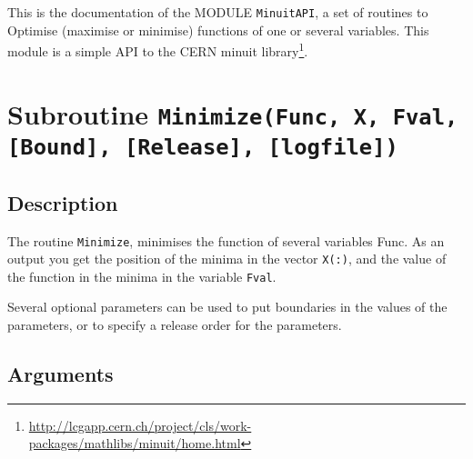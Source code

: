 
This is the documentation of the MODULE \texttt{MinuitAPI}, a set
of routines to Optimise (maximise or minimise) functions of one or
several variables. This module is a simple API to the CERN minuit
library\footnote{\href{http://lcgapp.cern.ch/project/cls/work-packages/mathlibs/minuit/home.html}{http://lcgapp.cern.ch/project/cls/work-packages/mathlibs/minuit/home.html}}. 

\section{Subroutine \texttt{Minimize(Func, X, Fval, [Bound], [Release], [logfile]) }}

\subsection{Description}

The routine \texttt{Minimize}, minimises the function of several
variables Func. As an output you get the position of the minima in the
vector \texttt{X(:)}, and the value of the function in the minima in
the variable \texttt{Fval}. 

Several optional parameters can be used to put boundaries in the
values of the parameters, or to specify a release order for the
parameters. 

\subsection{Arguments}

